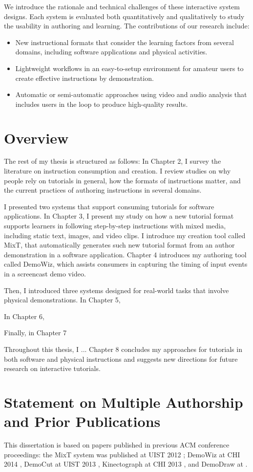 We introduce the rationale and technical challenges of these interactive system designs. Each system is evaluated both quantitatively and qualitatively to study the usability in authoring and learning. The contributions of our research include:

\begin{itemize}
  \setlength{\itemsep}{0pt}
\item New instructional formats that consider the learning factors from several domains, including software applications and physical activities.
\item Lightweight workflows in an easy-to-setup environment for amateur users to create effective instructions by demonstration.
\item Automatic or semi-automatic approaches using video and audio analysis that includes users in the loop to produce high-quality results.
\end{itemize}

\section{Overview}

The rest of my thesis is structured as follows:
%
In Chapter 2, I survey the literature on instruction consumption and creation. I review studies on why people rely on tutorials in general, how the formats of instructions matter, and the current practices of authoring instructions in several domains.

I presented two systems that support consuming tutorials for software applications.
In Chapter 3, I present my study on how a new tutorial format supports learners in following step-by-step instructions with mixed media, including static text, images, and video clips. I introduce my creation tool called MixT, that automatically generates such new tutorial format from an author demonstration in a software application.
%
Chapter 4 introduces my authoring tool called DemoWiz, which assists consumers in capturing the timing of input events in a screencast demo video.

Then, I introduced three systems designed for real-world tasks that involve physical demonstrations.
In Chapter 5,

In Chapter 6,

Finally, in Chapter 7

Throughout this thesis, I ... Chapter 8 concludes my approaches for tutorials in both software and physical instructions and suggests new directions for future research on interactive tutorials.

\section {Statement on Multiple Authorship and Prior Publications}

This dissertation is based on papers published in previous ACM conference proceedings: the MixT system was published at UIST 2012 \cite{Chi:2012fq}; DemoWiz at CHI 2014 \cite{Chi:2014td}, DemoCut at UIST 2013 \cite{Chi:2013hx}, Kinectograph at CHI 2013 \cite{Cheng:2013bu}, and DemoDraw at .
